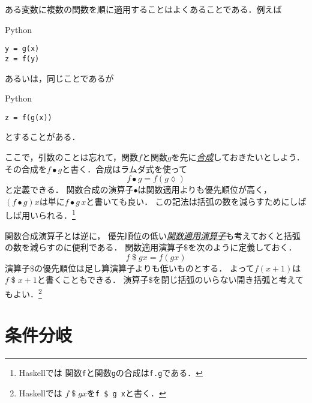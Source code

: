 \documentclass[a5paper,draft]{jsbook}
\newcommand{\programminglanguage}[1]{\textsf{#1}}
\newcommand{\haskell}{\programminglanguage{Haskell}}
\newcommand{\python}{\programminglanguage{Python}}
\newcommand{\keyword}[1]{{\underline{\emph{#1}}}}
\newcommand{\code}[1]{\texttt{#1}}
\newenvironment{pythoncode}{\begin{itembox}[r]{\python}}{\end{itembox}}
\newcommand{\mathAnonymousParameter}{\lozenge}
\newcommand{\mathApply}{\mathbin{\$}}
\newcommand{\mathCompose}{\mathbin{\bullet}}
\begin{document}
ある変数に複数の関数を順に適用することはよくあることである．例えば
\begin{pythoncode}
\begin{verbatim}
y = g(x)
z = f(y)
\end{verbatim}
\end{pythoncode}
あるいは，同じことであるが
\begin{pythoncode}
\begin{verbatim}
z = f(g(x))
\end{verbatim}
\end{pythoncode}
とすることがある．

ここで，引数のことは忘れて，関数$f$と関数$g$を先に\keyword{合成}しておきたいとしよう．
その合成を$f\mathCompose g$と書く．合成はラムダ式を使って
\begin{equation}
f\mathCompose g=f\left(g\mathAnonymousParameter\right)
\end{equation}
と定義できる．
関数合成の演算子$\mathCompose$は関数適用よりも優先順位が高く，
$\left(f\mathCompose g\right)x$は単に$f\mathCompose g\,x$と書いても良い．
この記法は括弧の数を減らすためにしばしば用いられる．\footnote{\haskell では
関数\code{f}と関数\code{g}の合成は\code{f.g}である．}

関数合成演算子とは逆に，
優先順位の低い\keyword{関数適用演算子}も考えておくと括弧の数を減らすのに便利である．
関数適用演算子$\mathApply$を次のように定義しておく．
\begin{equation}
f\mathApply gx=f\left(gx\right)
\end{equation}
演算子$\mathApply$の優先順位は足し算演算子よりも低いものとする．
よって$f(x+1)$は$f\mathApply x+1$と書くこともできる．
演算子$\mathApply$を閉じ括弧のいらない開き括弧と考えてもよい．\footnote{\haskell では
$f\mathApply gx$を\code{f \$ g x}と書く．}

\section{条件分岐}
\label{sec:if}
\end{document}
